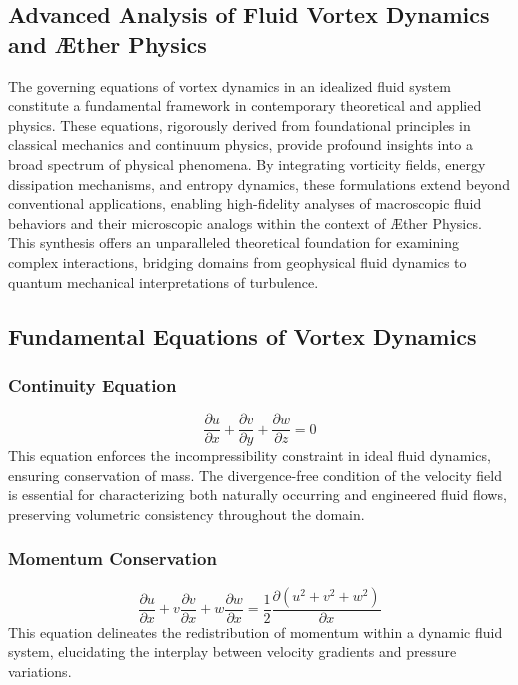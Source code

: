 

    \subsection*{Advanced Analysis of Fluid Vortex Dynamics and Æther Physics}

    The governing equations of vortex dynamics in an idealized fluid system constitute a fundamental framework in contemporary theoretical and applied physics. These equations, rigorously derived from foundational principles in classical mechanics and continuum physics, provide profound insights into a broad spectrum of physical phenomena. By integrating vorticity fields, energy dissipation mechanisms, and entropy dynamics, these formulations extend beyond conventional applications, enabling high-fidelity analyses of macroscopic fluid behaviors and their microscopic analogs within the context of Æther Physics. This synthesis offers an unparalleled theoretical foundation for examining complex interactions, bridging domains from geophysical fluid dynamics to quantum mechanical interpretations of turbulence.

    \subsection*{Fundamental Equations of Vortex Dynamics}

    \subsubsection*{Continuity Equation}
    \begin{equation*}
        \frac{\partial u}{\partial x} + \frac{\partial v}{\partial y} + \frac{\partial w}{\partial z} = 0
    \end{equation*}
    This equation enforces the incompressibility constraint in ideal fluid dynamics, ensuring conservation of mass. The divergence-free condition of the velocity field is essential for characterizing both naturally occurring and engineered fluid flows, preserving volumetric consistency throughout the domain.

    \subsubsection*{Momentum Conservation}
    \begin{equation*}
        \frac{\partial u}{\partial x} + v \frac{\partial v}{\partial x} + w \frac{\partial w}{\partial x} = \frac{1}{2} \frac{\partial (u^2 + v^2 + w^2)}{\partial x}
    \end{equation*}
    This equation delineates the redistribution of momentum within a dynamic fluid system, elucidating the interplay between velocity gradients and pressure variations.

